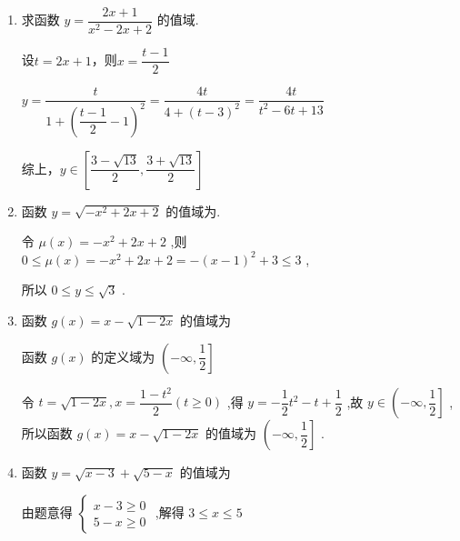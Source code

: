 \begin{enumerate}
\begin{jieda}
        所以原函数的值域为 $\{ y \mid  y \neq   - 1$ 且 $y \neq  1\}$ .
    \end{jieda}
    \item 求函数 $y = \dfrac{{2x} + 1}{{x}^{2} - {2x} + 2}$ 的值域.
    \begin{jieda}
        设$t = 2x+1$，则$x = \dfrac{t-1}{2}$

        $y = \dfrac{t}{1 + \left(\dfrac{t-1}{2} - 1\right)^2} = \dfrac{4t}{4 + (t-3)^2} = \dfrac{4t}{t^2-6t+13}$

        \begin{dingautolist}{172}
            \item 当$t = 0$时，$y = 0$
            \item 当$t \neq 0$时，$y = \dfrac{4}{t+\dfrac{13}{t}-6}$

            $t + \dfrac{13}{t} \in (-\infty, -2\sqrt{13}] \cup [2\sqrt{13}, +\infty)$，故$t+\dfrac{13}{t}-6 \in (-\infty, -2\sqrt{13}-6] \cup [2\sqrt{13}-6, +\infty)$，故$y \in \left[\dfrac{3 - \sqrt{13}}{2}, 0\right)\cup\left(0, \dfrac{3 + \sqrt{13}}{2}\right]$
        \end{dingautolist}
        综上，$y \in \left\lbrack  {\dfrac{3 - \sqrt{13}}{2},\dfrac{3 + \sqrt{13}}{2}}\right\rbrack$
    \end{jieda}
    
    \item 函数 $y = \sqrt{-{x}^{2} + {2x} + 2}$ 的值域为.
    \begin{jieda}
        令 $\mu \left( x\right)  =  - {x}^{2} + {2x} + 2$ ,则 $0 \leq  \mu \left( x\right)  =  - {x}^{2} + {2x} + 2 =  - {\left( x - 1\right) }^{2} + 3 \leq  3$ ,

        所以 $0 \leq  y \leq  \sqrt{3}$ .
    \end{jieda}
    
    \item 函数 $g\left( x\right)  = x - \sqrt{1 - {2x}}$ 的值域为
    \begin{jieda}
        函数 $g\left( x\right)$ 的定义域为 $\left( {-\infty ,\dfrac{1}{2}}\right\rbrack$
        
        令 $t = \sqrt{1 - {2x}},x = \dfrac{1 - {t}^{2}}{2}\left( {t \geq  0}\right)$ ,得 $y =  - \dfrac{1}{2}{t}^{2} - t + \dfrac{1}{2}$ ,故 $y \in  \left( {-\infty ,\dfrac{1}{2}}\right\rbrack$ ,
        所以函数 $g\left( x\right)  = x - \sqrt{1 - {2x}}$ 的值域为 $\left( {-\infty ,\dfrac{1}{2}}\right\rbrack$ .
    \end{jieda}
    \item 函数 $y = \sqrt{x - 3} + \sqrt{5 - x}$ 的值域为
    \begin{jieda}
        由题意得 $\left\{  \begin{array}{l} x - 3 \geq  0 \\  5 - x \geq  0 \end{array}\right.$ ,解得 $3 \leq  x \leq  5$ 
        

\end{jieda}
\end{enumerate}
